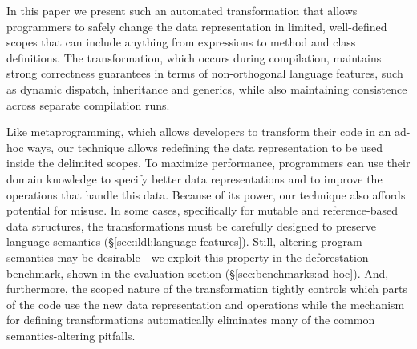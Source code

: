 In this paper we present such an automated transformation that allows programmers to safely change the data representation in limited, well-defined scopes that can include anything from expressions to method and class definitions. The transformation, which occurs during compilation, maintains strong correctness guarantees in terms of non-orthogonal language features, such as dynamic dispatch, inheritance and generics, while also maintaining consistence across separate compilation runs.

Like metaprogramming, which allows developers to transform their code
in an ad-hoc ways, our technique allows redefining the data
representation to be used inside the delimited scopes. To maximize
performance, programmers can use their domain knowledge to specify
better data representations and to improve the operations that handle
this data. %
Because of its power, our technique also affords potential
for misuse. In some cases, specifically for mutable and
reference-based data structures, the transformations
must be carefully designed to preserve language semantics
(\S\ref{sec:ildl:language-features}). Still, altering program
semantics may be desirable---we exploit this property in the
deforestation benchmark, shown in the evaluation section (\S\ref{sec:benchmarks:ad-hoc}).
And, furthermore, the scoped nature of the transformation tightly controls which
parts of the code use the new data representation and operations while
the mechanism for defining transformations automatically eliminates
many of the common semantics-altering pitfalls.

